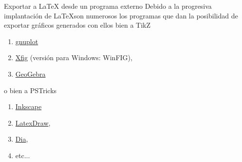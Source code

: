 \documentclass[10pt]{beamer}
\begin{document}
\begin{frame}{Exportar a \LaTeX{} desde un programa externo}
Debido a la progresiva implantaci\'on de \LaTeX  son  numerosos los programas que 
dan la posibilidad de exportar gr\'aficos  generados con ellos bien a TikZ
\begin{enumerate}
\item \href{https://ctan.org/pkg/gnuplottex}{\color{blue} gnuplot}
\item \href{https://mcj.sourceforge.net/latex_and_xfig.html}{\color{blue} Xfig} {\small (versi\'on para Windows: WinFIG)}, 
\item \href{http://www.geogebra.org/cms/}{\color{blue} GeoGebra}

\end{enumerate}
o bien a PSTricks
\begin{enumerate}
\item  \href{https://inkscape-manuals.readthedocs.io/en/latest/export-other-formats.html}{\color{blue} Inkscape}
\item \href{http://latexdraw.sourceforge.net}{\color{blue} LatexDraw},
\item \href{http://dia-installer.de/index.html.en}{\color{blue} Dia},
\item etc...
\end{enumerate}
\end{frame}
\end{document}
